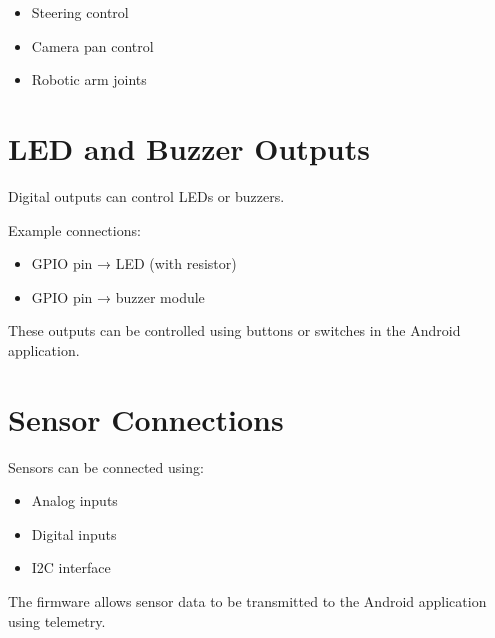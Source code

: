 \begin{itemize}
	\item Steering control
	\item Camera pan control
	\item Robotic arm joints
\end{itemize}

\section{LED and Buzzer Outputs}

Digital outputs can control LEDs or buzzers.

Example connections:

\begin{itemize}
	\item GPIO pin → LED (with resistor)
	\item GPIO pin → buzzer module
\end{itemize}

These outputs can be controlled using buttons or switches in the Android application.

\section{Sensor Connections}

Sensors can be connected using:

\begin{itemize}
	\item Analog inputs
	\item Digital inputs
	\item I2C interface
\end{itemize}

The firmware allows sensor data to be transmitted to the Android application using telemetry.